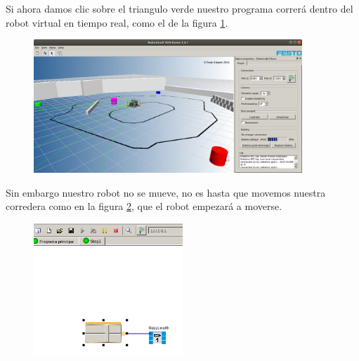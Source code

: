 \begin{frame}
	Si ahora damos clic sobre el triangulo verde nuestro programa correrá dentro del robot virtual en tiempo real, como el de la figura \ref{fig:conexion-07}.

	\begin{figure}
		\begin{center}
			\includegraphics[width=0.9\textwidth]{images/01-conexion/07.png}
			\label{fig:conexion-07}
		\end{center}
	\end{figure}
\end{frame}

\begin{frame}
	Sin embargo nuestro robot no se mueve, no es hasta que movemos nuestra corredera como en la figura \ref{fig:pruebas-03}, que el robot empezará a moverse.

	\begin{figure}
		\begin{center}
			\includegraphics[width=0.5\textwidth]{images/02-pruebas/03.png}
			\label{fig:pruebas-03}
		\end{center}
	\end{figure}
\end{frame}

